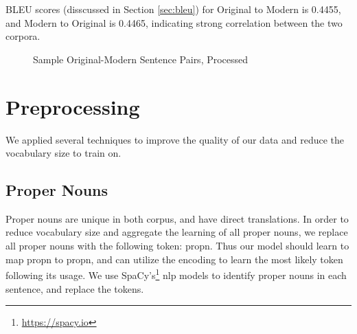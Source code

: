 \documentclass[twoside,twocolumn]{article}
\begin{document}
BLEU scores (disscussed in Section \ref{sec:bleu}) for Original to Modern is
0.4455, and Modern to Original is 0.4465, indicating strong correlation between
the two corpora.
\begin{figure*}[ht]
  \centering
  \caption{Sample Original-Modern Sentence Pairs, Processed}
  \label{fig:sample-pairs}
\end{figure*}
\section{Preprocessing}
\label{sec:preprocess}
We applied several techniques to improve the quality of our data and reduce the
vocabulary size to train on.
\subsection{Proper Nouns}
Proper nouns are unique in both corpus, and have direct translations. In order
to reduce vocabulary size and aggregate the learning of all proper nouns,
we replace all proper nouns with the following token: propn. Thus our model
should learn to map propn to propn, and can utilize the encoding to learn the
most likely token following its usage. We use
SpaCy's\footnote{\url{https://spacy.io}} nlp models to identify
proper nouns in each sentence, and replace the tokens.
\end{document}
